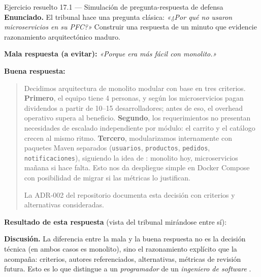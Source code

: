 \begin{cajaejemplo}{Ejercicio resuelto 17.1 --- Simulación de pregunta-respuesta de defensa}
\textbf{Enunciado.} El tribunal hace una pregunta clásica:
\emph{«¿Por qué no usaron microservicios en su PFC?»} Construir una
respuesta de un minuto que evidencie razonamiento arquitectónico
maduro.

\textbf{Mala respuesta (a evitar):} \emph{«Porque era más fácil con
monolito.»}

\textbf{Buena respuesta:}
\begin{quote}
\small Decidimos arquitectura de monolito modular con base en tres
criterios. \textbf{Primero}, el equipo tiene 4 personas, y según
\cite{newman2019monolith} los microservicios pagan dividendos a
partir de 10--15 desarrolladores; antes de eso, el overhead operativo
supera al beneficio. \textbf{Segundo}, los requerimientos no presentan
necesidades de escalado independiente por módulo: el carrito y el
catálogo crecen al mismo ritmo. \textbf{Tercero}, modularizamos
internamente con paquetes Maven separados
(\texttt{usuarios}, \texttt{productos}, \texttt{pedidos},
\texttt{notificaciones}), siguiendo la idea de
\cite{auer2021monolithic}: monolito hoy, microservicios mañana si
hace falta. Esto nos da despliegue simple en Docker Compose con
posibilidad de migrar si las métricas lo justifican.

La ADR-002 del repositorio documenta esta decisión con criterios y
alternativas consideradas.
\end{quote}

\textbf{Resultado de esta respuesta} (vista del tribunal mirándose
entre sí):

\begin{center}
\end{center}

\textbf{Discusión.} La diferencia entre la mala y la buena respuesta
no es la decisión técnica (en ambos casos es monolito), sino el
razonamiento explícito que la acompaña: criterios, autores
referenciados, alternativas, métricas de revisión futura. Esto es lo
que distingue a un \emph{programador} de un \emph{ingeniero de
software} \cite{martin2017clean}.
\end{cajaejemplo}

